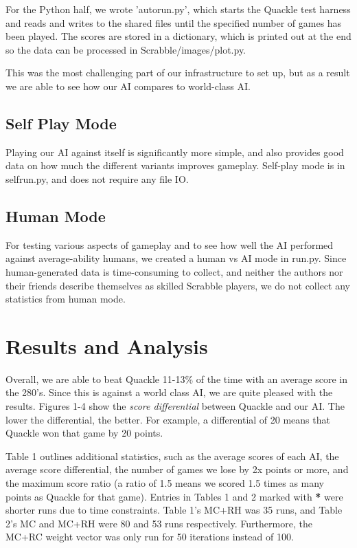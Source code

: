 \documentclass[12pt]{article}
\begin{document}
For the Python half, we wrote 'autorun.py', which starts the Quackle
test harness and reads and writes to the shared files until the
specified number of games has been played. The scores are stored in a
dictionary, which is printed out at the end so the data can be
processed in Scrabble/images/plot.py.

This was the most challenging part of our infrastructure to set up, but
as a result we are able to see how our AI compares to world-class AI.

\subsection*{Self Play Mode}
Playing our AI against itself is significantly more simple, and also
provides good data on how much the different variants improves
gameplay. Self-play mode is in selfrun.py, and does not require any
file IO.

\subsection*{Human Mode}

For testing various aspects of gameplay and to see how well the AI
performed against average-ability humans, we created a human vs AI
mode in run.py. Since human-generated data is time-consuming to
collect, and neither the authors nor their friends describe themselves
as skilled Scrabble players, we do not collect any statistics from
human mode.

\section*{Results and Analysis}
Overall, we are able to beat Quackle 11-13\% of the time with an
average score in the 280's. Since this is against a world class AI, we
are quite pleased with the results. Figures 1-4 show the \emph{score
  differential} between Quackle and our AI. The lower the
differential, the better. For example, a differential of 20 means that
Quackle won that game by 20 points.

Table 1 outlines additional statistics, such as the average scores of
each AI, the average score differential, the number of games we lose
by 2x points or more, and the maximum score ratio (a ratio of 1.5
means we scored 1.5 times as many points as Quackle for that game).
Entries in Tables 1 and 2 marked with \textbf{*} were shorter runs due
to time constraints. Table 1's MC+RH was 35 runs, and Table 2's MC and
MC+RH were 80 and 53 runs respectively. Furthermore, the MC+RC weight
vector was only run for 50 iterations instead of 100.
\end{document}
